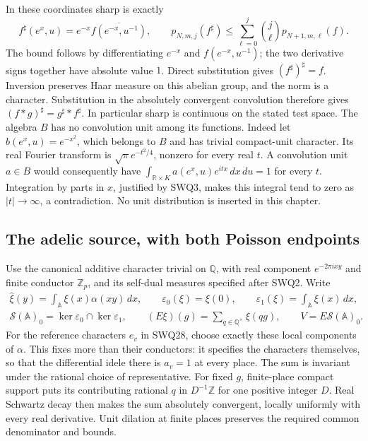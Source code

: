 \documentclass[11pt]{article}
\begin{document}
In these coordinates sharp is exactly
\begin{equation}\tag{SWQ5}
 f^{\sharp}(e^x,u)=e^{-x}\overline{f(e^{-x},u^{-1})},\qquad
 p_{N,m,j}(f^{\sharp})\le
 \sum_{\ell=0}^j\binom j\ell p_{N+1,m,\ell}(f).
\end{equation}
The bound follows by differentiating $e^{-x}$ and $f(e^{-x},u^{-1})$;
the two derivative signs together have absolute value $1$.
Direct substitution gives $(f^{\sharp})^{\sharp}=f$.
Inversion preserves Haar measure on this abelian group, and the norm
is a character. Substitution in the absolutely convergent convolution
therefore gives $(f*g)^{\sharp}=g^{\sharp}*f^{\sharp}$.
In particular sharp is continuous on the stated test space.
The algebra $B$ has no convolution unit among its functions.
Indeed let $b(e^x,u)=e^{-x^2}$, which belongs to $B$ and has
trivial compact-unit character. Its real Fourier transform is
$\sqrt\pi e^{-t^2/4}$, nonzero for every real $t$. A convolution
unit $a\in B$ would consequently have
$\int_{\mathbb R\times K}a(e^x,u)e^{itx}\,dx\,du=1$ for every
$t$. Integration by parts in $x$, justified by SWQ3, makes this
integral tend to zero as $|t|\to\infty$, a contradiction.
No unit distribution is inserted in this chapter.

\subsection{The adelic source, with both Poisson endpoints}

Use the canonical additive character trivial on $\mathbb Q$, with
real component $e^{-2\pi ixy}$ and finite conductor $\mathbb Z_p$,
and its self-dual measures specified after SWQ2. Write
\begin{equation}\tag{SWQ6}
\begin{gathered}
 \widehat\xi(y)=\int_{\mathbb A}\xi(x)\alpha(xy)\,dx,
 \qquad \varepsilon_0(\xi)=\xi(0),\qquad
 \varepsilon_1(\xi)=\int_{\mathbb A}\xi(x)\,dx,\\
 \mathcal S(\mathbb A)_0=\ker\varepsilon_0\cap\ker\varepsilon_1,
 \qquad (E\xi)(g)=\sum_{q\in\mathbb Q^{\times}}\xi(qg),
 \qquad V=E\mathcal S(\mathbb A)_0.
\end{gathered}
\end{equation}
For the reference characters $e_v$ in SWQ28, choose exactly
these local components of $\alpha$. This fixes more than their
conductors: it specifies the characters themselves, so that
the differential idele there is $a_v=1$ at every place.
The sum is invariant under the rational choice of representative.
For fixed $g$, finite-place compact support puts its contributing
rational $q$ in $D^{-1}\mathbb Z$ for one positive integer $D$.
Real Schwartz decay then makes the sum absolutely convergent,
locally uniformly with every real derivative. Unit dilation at
finite places preserves the required common denominator and bounds.
\end{document}
